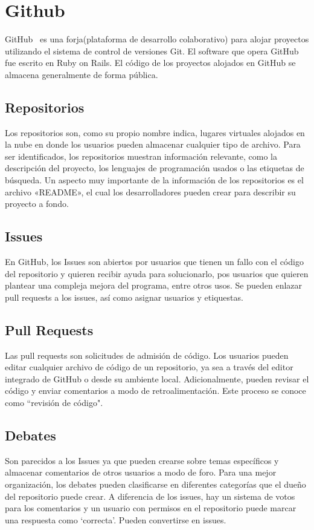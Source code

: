 \documentclass[a4paper, 12pt]{book}
\begin{document}
\section{Github}
\label{sec:Github}

GitHub~\cite{website:GitHub} es una forja(plataforma de desarrollo colaborativo) para alojar proyectos utilizando el sistema de control de versiones Git. El software que opera GitHub fue escrito en Ruby on Rails. El código de los proyectos alojados en GitHub se almacena generalmente de forma pública.

\subsection{Repositorios}

Los repositorios son, como su propio nombre indica, lugares virtuales alojados en la nube en donde los usuarios pueden almacenar cualquier tipo de archivo. Para ser identificados, los repositorios muestran información relevante, como la descripción del proyecto, los lenguajes de programación usados o las etiquetas de búsqueda. Un aspecto muy importante de la información de los repositorios es el archivo «README», el cual los desarrolladores pueden crear para describir su proyecto a fondo.

\subsection{Issues}

En GitHub, los Issues son abiertos por usuarios que tienen un fallo con el código del repositorio y quieren recibir ayuda para solucionarlo, pos usuarios que quieren plantear una compleja mejora del programa, entre otros usos. Se pueden enlazar pull requests a los issues, así como asignar usuarios y etiquestas.

\subsection{Pull Requests}

Las pull requests son solicitudes de admisión de código. Los usuarios pueden editar cualquier archivo de código de un repositorio, ya sea a través del editor integrado de GitHub o desde su ambiente local. Adicionalmente, pueden revisar el código y enviar comentarios a modo de retroalimentación. Este proceso se conoce como ``revisión de código".

\subsection{Debates}
Son parecidos a los Issues ya que pueden crearse sobre temas específicos y almacenar comentarios de otros usuarios a modo de foro. Para una mejor organización, los debates pueden clasificarse en diferentes categorías que el dueño del repositorio puede crear. A diferencia de los issues, hay un sistema de votos para los comentarios y un usuario con permisos en el repositorio puede marcar una respuesta como `correcta'. Pueden convertirse en issues.
\end{document}
